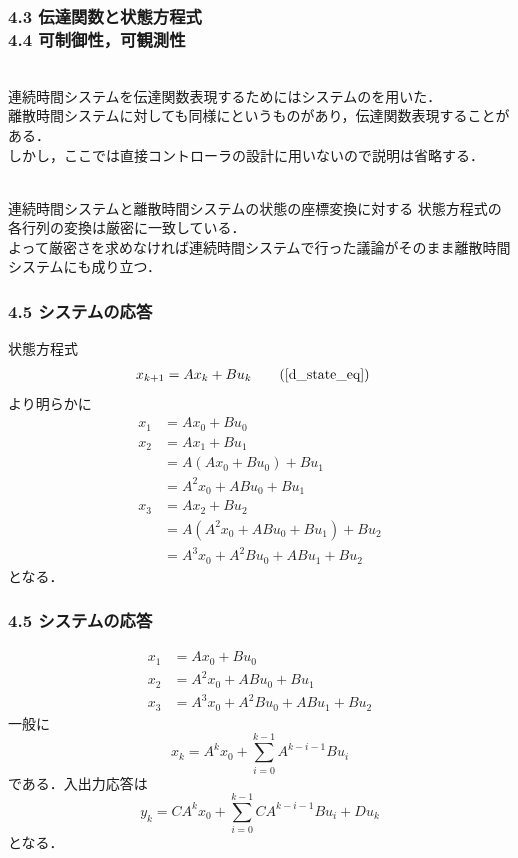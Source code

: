 \begin{frame}[t]
\frametitle{4.3 伝達関数と状態方程式 \\
4.4 可制御性，可観測性}
\\
連続時間システムを伝達関数表現するためにはシステムのを用いた．\\
離散時間システムに対しても同様にというものがあり，伝達関数表現することがある．\\
しかし，ここでは直接コントローラの設計に用いないので説明は省略する．

\vspace{5mm}

\\
連続時間システムと離散時間システムの状態の座標変換に対する
状態方程式の各行列の変換は厳密に一致している．\\
よって厳密さを求めなければ連続時間システムで行った議論がそのまま離散時間システムにも成り立つ．
\end{frame}

\begin{frame}[t]
\frametitle{4.5 システムの応答}
状態方程式
\begin{align}
 x_{k+1} &= A x_k + B u_k \tag{\ref{d_state_eq}}
\end{align}
より明らかに
\begin{align*}
 x_1 &= A x_0 + B u_0 \\
 x_2 &= A x_1 + B u_1 \\
     &= A (A x_0 + B u_0) + B u_1 \\
     &= A^2 x_0 + A B u_0 + B u_1 \\
 x_3 &= A x_2 + B u_2 \\
     &= A (A^2 x_0 + A B u_0 + B u_1) + B u_2 \\
     &= A^3 x_0 + A^2 B u_0 + A B u_1 + B u_2
\end{align*}
となる．
\end{frame}

\begin{frame}[t]
\frametitle{4.5 システムの応答}
\begin{align*}
 x_1 &= A x_0 + B u_0 \\
 x_2 &= A^2 x_0 + A B u_0 + B u_1 \\
 x_3 &= A^3 x_0 + A^2 B u_0 + A B u_1 + B u_2
\end{align*}
一般に
\begin{equation}
 x_k = A^k x_0 + \sum_{i=0}^{k-1} A^{k-i-1} B u_i
\end{equation}
である．入出力応答は
\begin{equation}
 y_k = C A^k x_0 + \sum_{i=0}^{k-1} C A^{k-i-1} B  u_i + D u_k
\end{equation}
となる．
\end{frame}

